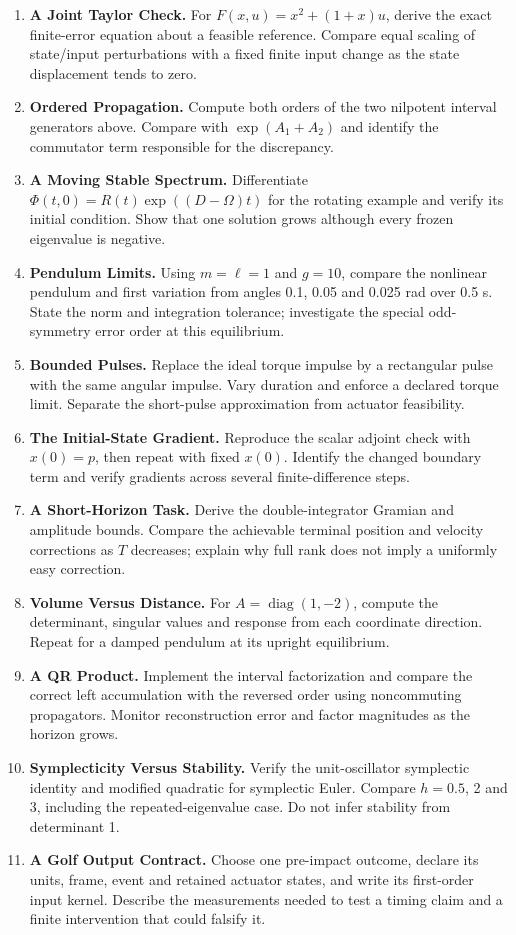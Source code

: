 \begin{enumerate}
\item \textbf{A Joint Taylor Check.} For $F(x,u)=x^2+(1+x)u$, derive the exact finite-error equation about a feasible reference. Compare equal scaling of state/input perturbations with a fixed finite input change as the state displacement tends to zero.
\item \textbf{Ordered Propagation.} Compute both orders of the two nilpotent interval generators above. Compare with $\exp(A_1+A_2)$ and identify the commutator term responsible for the discrepancy.
\item \textbf{A Moving Stable Spectrum.} Differentiate $\Phi(t,0)=R(t)\exp((D-\Omega)t)$ for the rotating example and verify its initial condition. Show that one solution grows although every frozen eigenvalue is negative.
\item \textbf{Pendulum Limits.} Using $m=\ell=1$ and $g=10$, compare the nonlinear pendulum and first variation from angles 0.1, 0.05 and 0.025 rad over 0.5 s. State the norm and integration tolerance; investigate the special odd-symmetry error order at this equilibrium.
\item \textbf{Bounded Pulses.} Replace the ideal torque impulse by a rectangular pulse with the same angular impulse. Vary duration and enforce a declared torque limit. Separate the short-pulse approximation from actuator feasibility.
\item \textbf{The Initial-State Gradient.} Reproduce the scalar adjoint check with $x(0)=p$, then repeat with fixed $x(0)$. Identify the changed boundary term and verify gradients across several finite-difference steps.
\item \textbf{A Short-Horizon Task.} Derive the double-integrator Gramian and amplitude bounds. Compare the achievable terminal position and velocity corrections as $T$ decreases; explain why full rank does not imply a uniformly easy correction.
\item \textbf{Volume Versus Distance.} For $A=\operatorname{diag}(1,-2)$, compute the determinant, singular values and response from each coordinate direction. Repeat for a damped pendulum at its upright equilibrium.
\item \textbf{A QR Product.} Implement the interval factorization and compare the correct left accumulation with the reversed order using noncommuting propagators. Monitor reconstruction error and factor magnitudes as the horizon grows.
\item \textbf{Symplecticity Versus Stability.} Verify the unit-oscillator symplectic identity and modified quadratic for symplectic Euler. Compare $h=0.5$, 2 and 3, including the repeated-eigenvalue case. Do not infer stability from determinant 1.
\item \textbf{A Golf Output Contract.} Choose one pre-impact outcome, declare its units, frame, event and retained actuator states, and write its first-order input kernel. Describe the measurements needed to test a timing claim and a finite intervention that could falsify it.
\end{enumerate}
